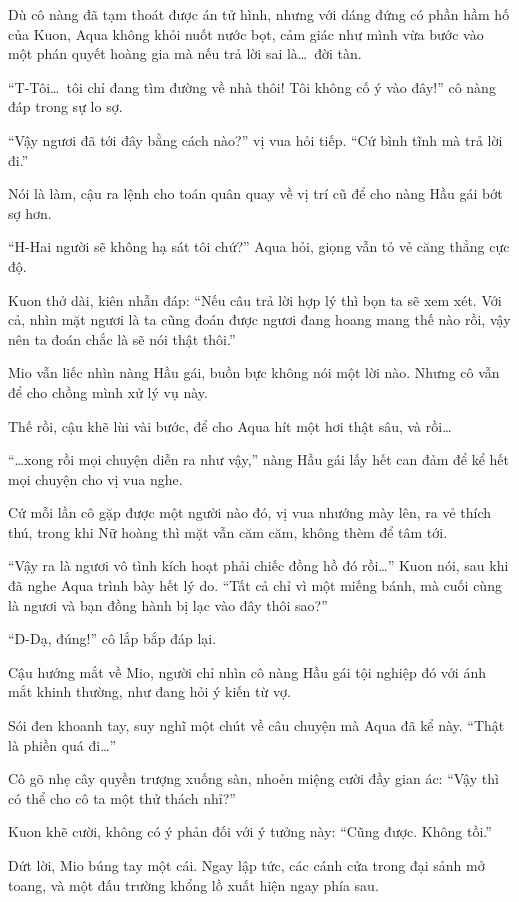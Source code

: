 \documentclass[../main.tex]{subfiles}
\begin{document}
Dù cô nàng đã tạm thoát được án tử hình, nhưng với dáng đứng có phần hầm hố của Kuon, Aqua không khỏi nuốt nước bọt, cảm giác như mình vừa bước vào một phán quyết hoàng gia mà nếu trả lời sai là\dots\ đời tàn.

``T-Tôi\dots\ tôi chỉ đang tìm đường về nhà thôi! Tôi không cố ý vào đây!'' cô nàng đáp trong sự lo sợ.

``Vậy ngươi đã tới đây bằng cách nào?'' vị vua hỏi tiếp. ``Cứ bình tĩnh mà trả lời đi.''

Nói là làm, cậu ra lệnh cho toán quân quay về vị trí cũ để cho nàng Hầu gái bớt sợ hơn.

``H-Hai người sẽ không hạ sát tôi chứ?'' Aqua hỏi, giọng vẫn tỏ vẻ căng thẳng cực độ.

Kuon thở dài, kiên nhẫn đáp: ``Nếu câu trả lời hợp lý thì bọn ta sẽ xem xét. Với cả, nhìn mặt ngươi là ta cũng đoán được ngươi đang hoang mang thế nào rồi, vậy nên ta đoán chắc là sẽ nói thật thôi.''

Mio vẫn liếc nhìn nàng Hầu gái, buồn bực không nói một lời nào. Nhưng cô vẫn để cho chồng mình xử lý vụ này.

Thế rồi, cậu khẽ lùi vài bước, để cho Aqua hít một hơi thật sâu, và rồi\dots

\ct

``\dots xong rồi mọi chuyện diễn ra như vậy,'' nàng Hầu gái lấy hết can đảm để kể hết mọi chuyện cho vị vua nghe.

Cứ mỗi lần cô gặp được một người nào đó, vị vua nhướng mày lên, ra vẻ thích thú, trong khi Nữ hoàng thì mặt vẫn căm căm, không thèm để tâm tới.

``Vậy ra là ngươi vô tình kích hoạt phải chiếc đồng hồ đó rồi\dots'' Kuon nói, sau khi đã nghe Aqua trình bày hết lý do. ``Tất cả chỉ vì một miếng bánh, mà cuối cùng là ngươi và bạn đồng hành bị lạc vào đây thôi sao?''

``D-Dạ, đúng!'' cô lắp bắp đáp lại.

Cậu hướng mắt về Mio, người chỉ nhìn cô nàng Hầu gái tội nghiệp đó với ánh mắt khinh thường, như đang hỏi ý kiến từ vợ.

Sói đen khoanh tay, suy nghĩ một chút về câu chuyện mà Aqua đã kể này. ``Thật là phiền quá đi\dots''

Cô gõ nhẹ cây quyền trượng xuống sàn, nhoẻn miệng cười đầy gian ác: ``Vậy thì có thể cho cô ta một thử thách nhỉ?''

Kuon khẽ cười, không có ý phản đối với ý tưởng này: ``Cũng được. Không tồi.''

Dứt lời, Mio búng tay một cái. Ngay lập tức, các cánh cửa trong đại sảnh mở toang, và một đấu trường khổng lồ xuất hiện ngay phía sau.
\end{document}
